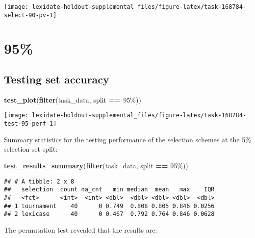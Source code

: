 \documentclass[
]{book}
\newenvironment{Shaded}{\begin{snugshade}}{\end{snugshade}}
\newcommand{\FunctionTok}[1]{\textcolor[rgb]{0.13,0.29,0.53}{\textbf{#1}}}
\newcommand{\NormalTok}[1]{#1}
\newcommand{\SpecialCharTok}[1]{\textcolor[rgb]{0.81,0.36,0.00}{\textbf{#1}}}
\newcommand{\StringTok}[1]{\textcolor[rgb]{0.31,0.60,0.02}{#1}}
\begin{document}
\texttt{[image: lexidate-holdout-supplemental\_files/figure-latex/task-168784-select-90-pv-1]}

\hypertarget{section-54}{%
\section{95\%}\label{section-54}}

\hypertarget{testing-set-accuracy-54}{%
\subsection{Testing set accuracy}\label{testing-set-accuracy-54}}

\begin{Shaded}
\begin{Highlighting}[]
\FunctionTok{test\_plot}\NormalTok{(}\FunctionTok{filter}\NormalTok{(task\_data, split }\SpecialCharTok{==} \StringTok{\textquotesingle{}95\%\textquotesingle{}}\NormalTok{))}
\end{Highlighting}
\end{Shaded}

\texttt{[image: lexidate-holdout-supplemental\_files/figure-latex/task-168784-test-95-perf-1]}

Summary statistics for the testing performance of the selection schemes at the 5\% selection set split:

\begin{Shaded}
\begin{Highlighting}[]
\FunctionTok{test\_results\_summary}\NormalTok{(}\FunctionTok{filter}\NormalTok{(task\_data, split }\SpecialCharTok{==} \StringTok{\textquotesingle{}95\%\textquotesingle{}}\NormalTok{))}
\end{Highlighting}
\end{Shaded}

\begin{verbatim}
## # A tibble: 2 x 8
##   selection  count na_cnt   min median  mean   max    IQR
##   <fct>      <int>  <int> <dbl>  <dbl> <dbl> <dbl>  <dbl>
## 1 tournament    40      0 0.749  0.808 0.805 0.846 0.0256
## 2 lexicase      40      0 0.467  0.792 0.764 0.846 0.0628
\end{verbatim}

The permutation test revealed that the results are:
\end{document}
